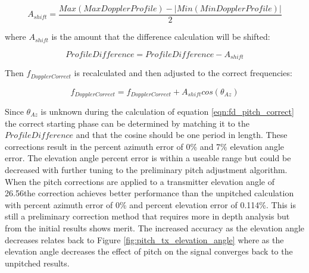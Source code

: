 \begin{equation}
	A_{shift} = \frac{Max(Max Doppler Profile) - |Min(Min Doppler Profile)|}{2}
	\label{eqn:pitch_shift}
\end{equation}

where $A_{shift}$ is the amount that the difference calculation will be shifted:

\begin{equation}
	ProfileDifference = ProfileDifference - A_{shift}
	\label{eqn:diff_shift}
\end{equation}

Then $f_{DopplerCorrect}$ is recalculated and then adjusted to the correct frequencies:

\begin{equation}
	f_{DopplerCorrect} = f_{DopplerCorrect} + A_{shift}cos\left(\theta_{Az}\right)
	\label{eqn:fd_pitch_correct}
\end{equation}

Since $\theta_{Az}$ is unknown during the calculation of equation \ref{eqn:fd_pitch_correct} the correct starting phase can be determined by matching it to the $ProfileDifference$ and that the cosine should be one period in length. These corrections result in the percent azimuth error of 0\% and 7\% elevation angle error. The elevation angle percent error is within a useable range but could be decreased with further tuning to the preliminary pitch adjustment algorithm. When the pitch corrections are applied to a transmitter elevation angle of 26.56\textdegree \space the correction achieves better performance than the unpitched calculation with percent azimuth error of 0\% and percent elevation error of 0.114\%. This is still a preliminary correction method that requires more in depth analysis but from the initial results shows merit. The increased accuracy as the elevation angle decreases relates back to Figure \ref{fig:pitch_tx_elevation_angle} where as the elevation angle decreases the effect of pitch on the signal converges back to the unpitched results.



